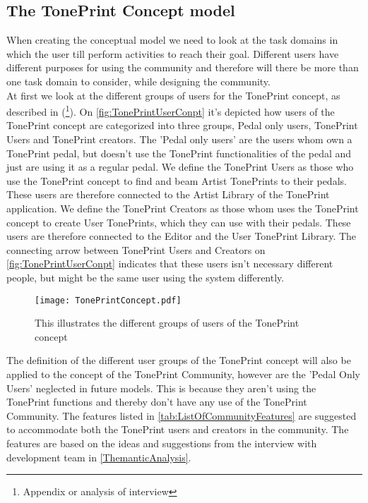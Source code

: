 \subsection{The TonePrint Concept model}
\label{TonePrintConceptualModel}
When creating the conceptual model we need to look at the task domains in which the user till perform activities to reach their goal. Different users have different purposes for using the community and therefore will there be more than one task domain to consider, while designing the community. \\
At first we look at the different groups of users for the TonePrint concept, as described in (\footnote{Appendix or analysis of interview}). On \autoref{fig:TonePrintUserConpt} it's depicted how users of the TonePrint concept are categorized into three groups, Pedal only users, TonePrint Users and TonePrint creators. The 'Pedal only users' are the users whom own a TonePrint pedal, but doesn't use the TonePrint functionalities of the pedal and just are using it as a regular pedal. We define the TonePrint Users as those who use the TonePrint concept to find and beam Artist TonePrints to their pedals. These users are therefore connected to the Artist Library of the TonePrint application. We define the TonePrint Creators as those whom uses the TonePrint concept to create User TonePrints, which they can use with their pedals. These users are therefore connected to the Editor and the User TonePrint Library. The connecting arrow between TonePrint Users and Creators on \autoref{fig:TonePrintUserConpt} indicates that these users isn't necessary different people, but might be the same user using the system differently. 

\begin{figure}[H]
	\centering
	\texttt{[image: TonePrintConcept.pdf]}
	\caption{This illustrates the different groups of users of the TonePrint concept}
	\label{fig:TonePrintUserConpt}
\end{figure}

The definition of the different user groups of the TonePrint concept will also be applied to the concept of the TonePrint Community, however are the 'Pedal Only Users' neglected in future models. This is because they aren't using the TonePrint functions and thereby don't have any use of the TonePrint Community. The features listed in \autoref{tab:ListOfCommunityFeatures} are suggested to accommodate both the TonePrint users and creators in the community. The features are based on the ideas and suggestions from the interview with development team in \autoref{ThemanticAnalysis}.

